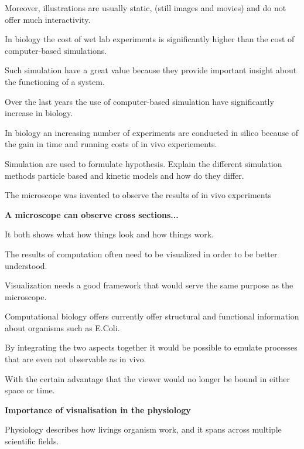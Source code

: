 Moreover, illustrations are usually static, (still images and movies) and do not offer much interactivity.
















In biology the cost of wet lab experiments is significantly higher than the cost of computer-based simulations.

Such simulation have a great value because they provide important insight about the functioning of a system. 

Over the last years the use of computer-based simulation have significantly increase in biology.





In biology an increasing number of experiments are conducted in silico because of the gain in time and running costs of in vivo experiements.

Simulation are used to formulate hypothesis.
Explain the different simulation methods particle based and kinetic models and how do they differ.

The microscope was invented to observe the results of in vivo experiments

\textbf{A microscope can observe cross sections...}

It both shows what how things look and how things work.

The results of computation often need to be visualized in order to be better understood.

Visualization needs a good framework that would serve the same purpose as the microscope.

Computational biology offers currently offer structural and functional information about organisms such as E.Coli.

By integrating the two aspects together it would be possible to emulate processes that are even not observable as in vivo.

With the certain advantage that the viewer would no longer be bound in either space or time. 



\textbf{Importance of visualisation in the physiology}

Physiology describes how livings organism work, and it spans across multiple scientific fields.

